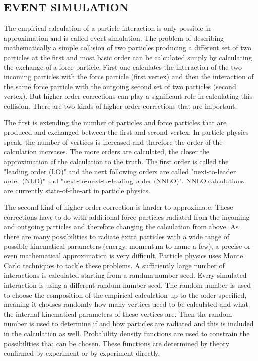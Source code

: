 \documentclass{wscpaperproc}
\theoremstyle{wsc}
\begin{document}
\subsection{EVENT SIMULATION} 
\label{subsec:eventsimulation}

The empirical calculation of a particle interaction is only possible in approximation and is called event simulation. The problem of describing mathematically a simple collision of two particles producing a different set of two particles at the first and most basic order can be calculated simply by calculating the exchange of a force particle. First one calculates the interaction of the two incoming particles with the force particle (first vertex) and then the interaction of the same force particle with the outgoing second set of two particles (second vertex). But higher order corrections can play a significant role in calculating this collision. There are two kinds of higher order corrections that are important. 

The first is extending the number of particles and force particles that are produced and exchanged between the first and second vertex. In particle physics speak, the number of vertices is increased and therefore the order of the calculation increases. The more orders are calculated, the closer the approximation of the calculation to the truth. The first order is called the "leading order (LO)" and the next following orders are called "next-to-leader order (NLO)" and "next-to-next-to-leading order (NNLO)". NNLO calculations are currently state-of-the-art in particle physics.

The second kind of higher order correction is harder to approximate. These corrections have to do with additional force particles radiated from the incoming and outgoing particles and therefore changing the calculation from above. As there are many possibilities to radiate extra particles with a wide range of possible kinematical parameters (energy, momentum to name a few), a precise or even mathematical approximation is very difficult. Particle physics uses Monte Carlo techniques to tackle these problems. A sufficiently large number of interactions is calculated starting from a randum number seed. Every simulated interaction is using a different randum number seed. The random number is used to choose the composition of the empirical calculation up to the order specified, meaning it chooses randomly how many vertices need to be calculated and what the internal kinematical parameters of these vertices are. Then the random number is used to determine if and how particles are radiated and this is included in the calculation as well. Probability density functions are used to constrain the possibilities that can be chosen. These functions are determined by theory confirmed by experiment or by experiment directly.
\end{document}
